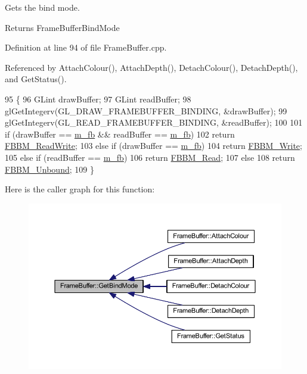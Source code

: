 Gets the bind mode. 

\begin{DoxyReturn}{Returns}
Frame\+Buffer\+Bind\+Mode
\end{DoxyReturn}


Definition at line 94 of file Frame\+Buffer.\+cpp.



Referenced by Attach\+Colour(), Attach\+Depth(), Detach\+Colour(), Detach\+Depth(), and Get\+Status().


\begin{DoxyCode}
95 \{
96   GLint drawBuffer;
97   GLint readBuffer;
98   glGetIntegerv(GL\_DRAW\_FRAMEBUFFER\_BINDING, &drawBuffer);
99   glGetIntegerv(GL\_READ\_FRAMEBUFFER\_BINDING, &readBuffer);
100 
101   \textcolor{keywordflow}{if} (drawBuffer == \hyperlink{class_frame_buffer_a4140264eca6a28a671947acb116df1ca}{m\_fb} && readBuffer == \hyperlink{class_frame_buffer_a4140264eca6a28a671947acb116df1ca}{m\_fb})
102     \textcolor{keywordflow}{return} \hyperlink{_frame_buffer_8h_a3318e72469ce5bc8393bd02d39bc3742ae77f3997d632fbdbe50556a908b53be1}{FBBM\_ReadWrite};
103   \textcolor{keywordflow}{else} \textcolor{keywordflow}{if} (drawBuffer == \hyperlink{class_frame_buffer_a4140264eca6a28a671947acb116df1ca}{m\_fb})
104     \textcolor{keywordflow}{return} \hyperlink{_frame_buffer_8h_a3318e72469ce5bc8393bd02d39bc3742ae25ce268dda344d3d5a1cf4b3b061723}{FBBM\_Write};
105   \textcolor{keywordflow}{else} \textcolor{keywordflow}{if} (readBuffer == \hyperlink{class_frame_buffer_a4140264eca6a28a671947acb116df1ca}{m\_fb})
106     \textcolor{keywordflow}{return} \hyperlink{_frame_buffer_8h_a3318e72469ce5bc8393bd02d39bc3742a4ef9947282b3e4054af7d0719aa119b5}{FBBM\_Read};
107   \textcolor{keywordflow}{else}
108     \textcolor{keywordflow}{return} \hyperlink{_frame_buffer_8h_a3318e72469ce5bc8393bd02d39bc3742ae31c8735e79d8dbbb9fab918f4de1089}{FBBM\_Unbound};
109 \}
\end{DoxyCode}


Here is the caller graph for this function\+:\nopagebreak
\begin{figure}[H]
\begin{center}
\leavevmode
\includegraphics[width=350pt]{class_frame_buffer_a850ac6fb641f1c7a2b4e15b70f5a2286_icgraph}
\end{center}
\end{figure}



